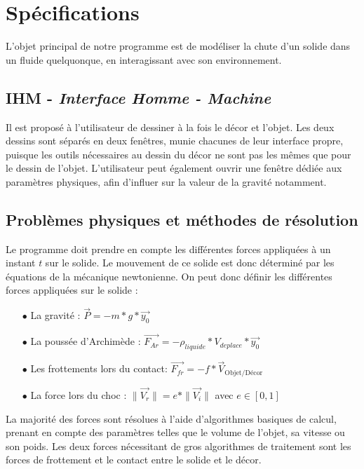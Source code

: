 \section{Spécifications}
L'objet principal de notre programme est de modéliser la chute d'un solide dans un
fluide quelquonque, en interagissant avec son environnement.
\subsection{IHM - \emph{Interface Homme - Machine}}
Il est proposé à l'utilisateur de dessiner à la fois le décor et l'objet.
Les deux dessins sont séparés en deux fenêtres, munie chacunes de leur interface propre,
puisque les outils nécessaires au dessin du décor ne sont pas les mêmes que pour le dessin de l'objet.
L'utilisateur peut également ouvrir une fenêtre dédiée aux paramètres physiques, afin d'influer
sur la valeur de la gravité notamment.
\subsection{Problèmes physiques et méthodes de résolution}
Le programme doit prendre en compte les différentes forces appliquées à 
un instant $t$ sur le solide. Le mouvement de ce solide est donc déterminé
par les équations de la mécanique newtonienne.
On peut donc définir les différentes forces appliquées sur le solide :
\begin{itemize}
\item[$\bullet$] La gravité : \dotfill{} $\overrightarrow{P} = -m*g*\overrightarrow{y_0}$ 
\item[$\bullet$] La poussée d'Archimède : \dotfill{} $\overrightarrow{F_{Ar}} = -\rho_{liquide} * V_{deplace} *\overrightarrow{y_0} $
\item[$\bullet$] Les frottements lors du contact: \dotfill{}$\overrightarrow{F_{fr}} = -f*\overrightarrow{V}_{\text{Objet/Décor}}$
\item[$\bullet$] La force lors du choc : \dotfill{} $ \|\overrightarrow{V_r} \|= e * \| \overrightarrow{V_i} \|$ avec $ e \in [ 0 , 1 ] $\\
\end{itemize}

La majorité des forces sont résolues à l'aide d'algorithmes basiques de
calcul, prenant en compte des paramètres telles que le volume de l'objet,
sa vitesse ou son poids. Les deux forces nécessitant de gros algorithmes
de traitement sont les forces de frottement et le contact entre le solide
et le décor.

